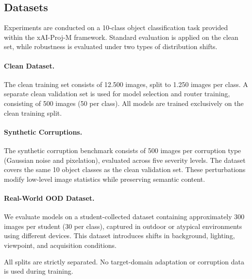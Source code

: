 \subsection{Datasets}

Experiments are conducted on a 10-class object classification task provided within the xAI-Proj-M framework. 
Standard evaluation is applied on the clean set, while robustness is evaluated under two types of distribution shifts.

\paragraph{Clean Dataset.}
The clean training set consists of 12.500 images, split to 1.250 images per class.
A separate clean validation set is used for model selection and router training, consisting of 500 images (50 per class).
All models are trained exclusively on the clean training split.

\paragraph{Synthetic Corruptions.}
The synthetic corruption benchmark consists of 500 images per corruption type (Gaussian noise and pixelation), evaluated across five severity levels.
The dataset covers the same 10 object classes as the clean validation set.
These perturbations modify low-level image statistics while preserving semantic content.

\paragraph{Real-World OOD Dataset.}
We evaluate models on a student-collected dataset containing approximately 300 images per student (30 per class), captured in outdoor or atypical environments using different devices.
This dataset introduces shifts in background, lighting, viewpoint, and acquisition conditions.

All splits are strictly separated.
No target-domain adaptation or corruption data is used during training.